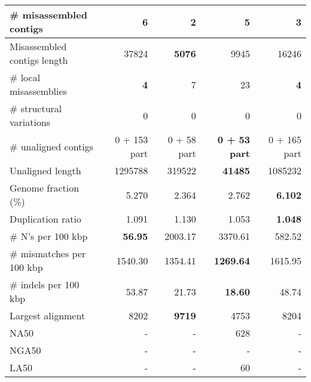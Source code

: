 \documentclass[12pt,a4paper]{article}
\begin{document}
\begin{table}[ht]
\begin{center}
\begin{tabular}{|l*{4}{|r}|}
\# misassembled contigs & 6 & {\bf 2} & 5 & 3 \\ \hline
Misassembled contigs length & 37824 & {\bf 5076} & 9945 & 16246 \\ \hline
\# local misassemblies & {\bf 4} & 7 & 23 & {\bf 4} \\ \hline
\# structural variations & 0 & 0 & 0 & 0 \\ \hline
\# unaligned contigs & 0 + 153 part & 0 + 58 part & {\bf 0 + 53 part} & 0 + 165 part \\ \hline
Unaligned length & 1295788 & 319522 & {\bf 41485} & 1085232 \\ \hline
Genome fraction (\%) & 5.270 & 2.364 & 2.762 & {\bf 6.102} \\ \hline
Duplication ratio & 1.091 & 1.130 & 1.053 & {\bf 1.048} \\ \hline
\# N's per 100 kbp & {\bf 56.95} & 2003.17 & 3370.61 & 582.52 \\ \hline
\# mismatches per 100 kbp & 1540.30 & 1354.41 & {\bf 1269.64} & 1615.95 \\ \hline
\# indels per 100 kbp & 53.87 & 21.73 & {\bf 18.60} & 48.74 \\ \hline
Largest alignment & 8202 & {\bf 9719} & 4753 & 8204 \\ \hline
NA50 & - & - & 628 & - \\ \hline
NGA50 & - & - & - & - \\ \hline
LA50 & - & - & 60 & - \\ \hline
\end{tabular}
\end{center}
\end{table}
\end{document}
